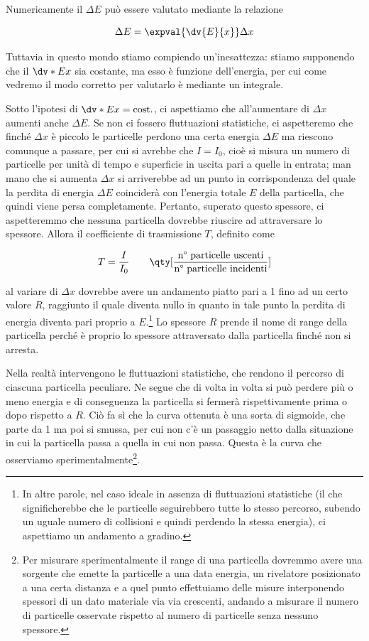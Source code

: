 \vspace{0.2cm}Numericamente il $\Delta E$ può essere valutato mediante la relazione

\begin{equation*}
    \Delta E=\expval{\dv{E}{x}}\Delta x
\end{equation*}

Tuttavia in questo mondo stiamo compiendo un'inesattezza: stiamo supponendo che il $\dv*{E}{x}$ sia costante, ma esso è funzione dell'energia, per cui come vedremo il modo corretto per valutarlo è mediante un integrale.

Sotto l'ipotesi di $\dv*{E}{x}=\rm cost.$, ci aspettiamo che all'aumentare di $\Delta x$ aumenti anche $\Delta E$. Se non ci fossero fluttuazioni statistiche, ci aspetteremo che finché $\Delta x$ è piccolo le particelle perdono una certa energia $\Delta E$ ma riescono comunque a passare, per cui si avrebbe che $I=I_0$, cioè si misura un numero di particelle per unità di tempo e superficie in uscita pari a quelle in entrata; man mano che si aumenta $\Delta x$ si arriverebbe ad un punto in corrispondenza del quale la perdita di energia $\Delta E$ coinciderà con l'energia totale $E$ della particella, che quindi viene persa completamente. Pertanto, superato questo spessore, ci aspetteremmo che nessuna particella dovrebbe riuscire ad attraversare lo spessore. Allora il coefficiente di trasmissione $T$, definito come

\begin{equation*}
    T=\frac{I}{I_0}
    \qquad
    \qty[ \frac{\text{n° particelle uscenti}}{\text{n° particelle incidenti}} ]
\end{equation*}

al variare di $\Delta x$ dovrebbe avere un andamento piatto pari a 1 fino ad un certo valore $R$, raggiunto il quale diventa nullo in quanto in tale punto la perdita di energia diventa pari proprio a $E$.\footnote{In altre parole, nel caso ideale in assenza di fluttuazioni statistiche (il che significherebbe che le particelle seguirebbero tutte lo stesso percorso, subendo un uguale numero di collisioni e quindi perdendo la stessa energia), ci aspettiamo un andamento a gradino.} Lo spessore $R$ prende il nome di range della particella perché è proprio lo spessore attraversato dalla particella finché non si arresta.

Nella realtà intervengono le fluttuazioni statistiche, che rendono il percorso di ciascuna particella peculiare. Ne segue che di volta in volta si può perdere più o meno energia e di conseguenza la particella si fermerà rispettivamente prima o dopo rispetto a $R$. Ciò fa sì che la curva ottenuta è una sorta di sigmoide, che parte da 1 ma poi si smussa, per cui non c'è un passaggio netto dalla situazione in cui la particella passa a quella in cui non passa. Questa è la curva che osserviamo sperimentalmente\footnote{Per misurare sperimentalmente il range di una particella dovremmo avere una sorgente che emette la particelle a una data energia, un rivelatore posizionato a una certa distanza e a quel punto effettuiamo delle misure interponendo spessori di un dato materiale via via crescenti, andando a misurare il numero di particelle osservate rispetto al numero di particelle senza nessuno spessore.}.

